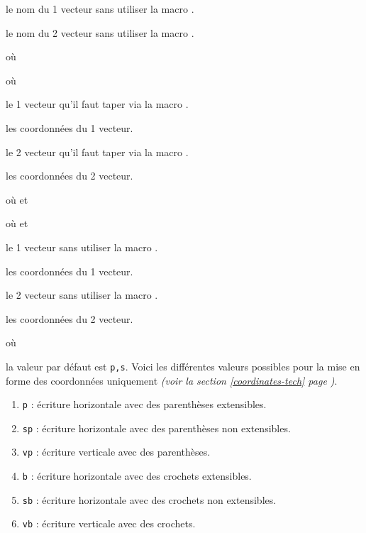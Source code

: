 \documentclass[12pt,a4paper]{article}
\begin{document}
 le nom du 1\ier{} vecteur sans utiliser la macro .

 le nom du 2\ieme{} vecteur sans utiliser la macro .


\separation


  où \quad {}

  où \quad {}

 le 1\ier{} vecteur qu'il faut taper via la macro .

 les coordonnées du 1\ier{} vecteur.

 le 2\ieme{} vecteur qu'il faut taper via la macro .

 les coordonnées du 2\ieme{} vecteur.


\separation


  où \quad {}
                                    et 

  où \quad {}
                                    et 

 le 1\ier{} vecteur sans utiliser la macro .

 les coordonnées du 1\ier{} vecteur.

 le 2\ieme{} vecteur sans utiliser la macro .

 les coordonnées du 2\ieme{} vecteur.


\separation


  où \quad {}

\IDoption{} la valeur par défaut est \verb+p,s+. 
            Voici les différentes valeurs possibles pour la mise en forme des coordonnées uniquement \emph{(voir la section \ref{coordinates-tech} page \pageref{coordinates-tech})}.
\begin{enumerate}
	\item \verb+p+ : écriture horizontale avec des parenthèses extensibles.

	\item \verb+sp+ : écriture horizontale avec des parenthèses non extensibles.

	\item \verb+vp+ : écriture verticale avec des parenthèses.

	\item \verb+b+ : écriture horizontale avec des crochets extensibles.

	\item \verb+sb+ : écriture horizontale avec des crochets non extensibles.

	\item \verb+vb+ : écriture verticale avec des crochets.
\end{enumerate}
\end{document}
